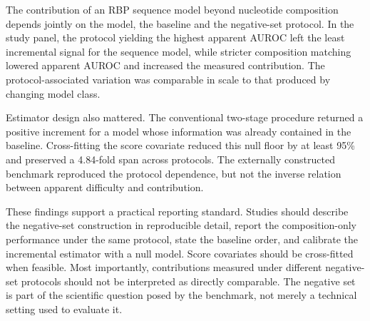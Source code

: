 The contribution of an RBP sequence model beyond nucleotide composition depends jointly on the
model, the baseline and the negative-set protocol. In the study panel, the protocol yielding the
highest apparent AUROC left the least incremental signal for the sequence model, while stricter
composition matching lowered apparent AUROC and increased the measured contribution. The
protocol-associated variation was comparable in scale to that produced by changing model
class.

Estimator design also mattered. The conventional two-stage procedure returned a positive
increment for a model whose information was already contained in the baseline. Cross-fitting
the score covariate reduced this null floor by at least 95\% and preserved a 4.84-fold span
across protocols. The externally constructed benchmark reproduced the protocol dependence, but
not the inverse relation between apparent difficulty and contribution.

These findings support a practical reporting standard. Studies should describe the negative-set
construction in reproducible detail, report the composition-only performance under the same
protocol, state the baseline order, and calibrate the incremental estimator with a null model.
Score covariates should be cross-fitted when feasible. Most importantly, contributions measured
under different negative-set protocols should not be interpreted as directly comparable. The
negative set is part of the scientific question posed by the benchmark, not merely a technical
setting used to evaluate it.

